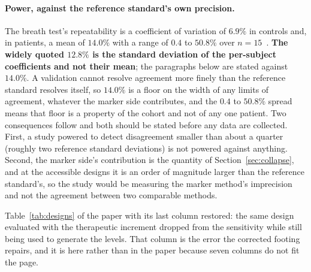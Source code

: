 \paragraph{Power, against the reference standard's own precision.} The breath test's
repeatability is a coefficient of variation of $6.9\%$ in controls and, in patients, a
mean of $14.0\%$ with a range of $0.4$ to $50.8\%$ over $n = 15$~\cite{breath_test_mma}.
\textbf{The widely quoted $12.8\%$ is the standard deviation of the per-subject
coefficients and not their mean}; the paragraphs below are stated against $14.0\%$. A validation
cannot resolve agreement more finely than the reference standard resolves itself, so
$14.0\%$ is a floor on the width of any limits of agreement, whatever the marker side
contributes, and the $0.4$ to $50.8\%$ spread means that floor is a property of the
cohort and not of any one patient. Two consequences follow and both should be stated before any data are
collected. First, a study powered to detect disagreement smaller than about a quarter
(roughly two reference standard deviations) is not powered against anything. Second, the
marker side's contribution is the quantity of Section~\ref{sec:collapse}, and at the
accessible designs it is an order of magnitude larger than the reference standard's, so the
study would be measuring the marker method's imprecision and not the agreement between two
comparable methods.


\begin{table}[htbp]
\centering
\footnotesize
\caption{\label{tab:designsfull}Table~\ref{tab:designs} of the paper with its last column
restored: the same design evaluated with the therapeutic increment dropped from the
sensitivity while still being used to generate the levels. That column is the error the
corrected footing repairs, and it is here rather than in the paper because seven columns
do not fit the page.}
\begin{adjustwidth}{-1.4cm}{-1.4cm}

\end{adjustwidth}
\end{table}

